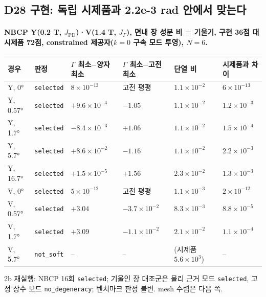 \subsection{D28 구현: 독립 시제품과 2.2e-3 rad 안에서 맞는다}\label{d28-verification}
\begingroup%
  \framesubtitle{NBCP Y(0.2 T, $J_{\mathrm{PD}}$)·V(1.4 T, $J_\Gamma$), 면내 장 성분 비 = 기울기, 구현 36점 대 시제품 72점, constrained 제공자($k=0$ 구속 모드 투영), $N=6$.}
  \footnotesize\renewcommand{\arraystretch}{1.08}
  \begin{tabularx}{\textwidth}{@{}P{1.6cm}P{1.5cm}P{2.3cm}P{2.3cm}P{1.6cm}Y@{}}
    \toprule
    경우 & 판정 & $\Gamma$ 최소$-$양자 최소 & $\Gamma$ 최소$-$고전 최소 & 단열 비 & 시제품과 차이 \\
    \midrule
    Y, 0° & \texttt{selected} & $8\times10^{-13}$ & 고전 평평 & $1.1\times10^{-2}$ & $6\times10^{-13}$ \\
    Y, 0.57° & \texttt{selected} & $+9.6\times10^{-4}$ & $-1.05$ & $1.1\times10^{-2}$ & $1.2\times10^{-3}$ \\
    Y, 1.7° & \texttt{selected} & $-8.4\times10^{-3}$ & $+1.06$ & $1.1\times10^{-2}$ & $1.5\times10^{-4}$ \\
    Y, 5.7° & \texttt{selected} & $+8.6\times10^{-2}$ & $-1.16$ & $1.1\times10^{-2}$ & $2.2\times10^{-3}$ \\
    Y, 16.7° & \texttt{selected} & $+1.5\times10^{-5}$ & $+1.56$ & $2.3\times10^{-2}$ & $1.3\times10^{-3}$ \\
    V, 0° & \texttt{selected} & $5\times10^{-12}$ & 고전 평평 & $1.1\times10^{-3}$ & $2\times10^{-12}$ \\
    V, 0.57° & \texttt{selected} & $+3.04$ & $-3.7\times10^{-2}$ & $8.3\times10^{-3}$ & $8.8\times10^{-5}$ \\
    V, 1.7° & \texttt{selected} & $+3.09$ & $-1.1\times10^{-2}$ & $2.1\times10^{-2}$ & $1.1\times10^{-4}$ \\
    V, 5.7° & \texttt{not\_soft} & -- & -- & (시제품 $5.6\times10^{3}$) & -- \\
    \bottomrule
  \end{tabularx}
  \par\smallskip
  2b 재실행: NBCP 16회 \texttt{selected}; 기울인 장 대조군은 물리 근거 모드 \texttt{selected}, 고정 상수 모드 \texttt{no\_degeneracy}; 벤치마크 판정 불변. mesh 수렴은 다음 쪽.
  \par\smallskip
\endgroup


